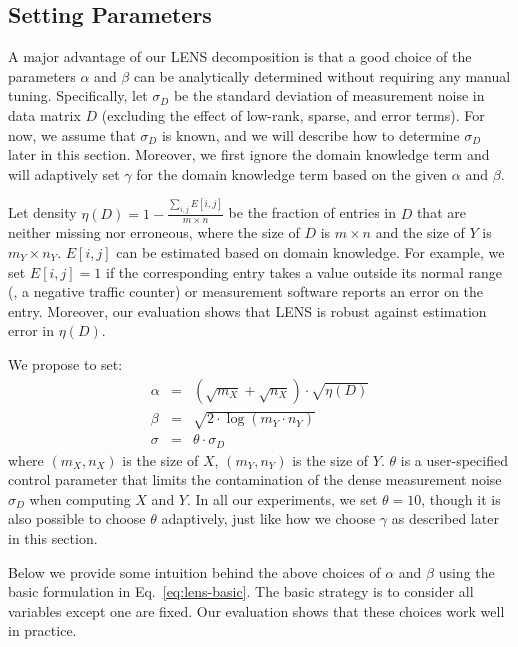\subsection{Setting Parameters}
\label{ssec:para}

 A major advantage of
our LENS decomposition is that a good choice of the parameters
$\alpha$ and $\beta$ can be analytically determined without requiring
any manual tuning.  Specifically, let $\sigma_D$ be the standard
deviation of measurement noise in data matrix $D$ (excluding the
effect of low-rank, sparse, and error terms).  For now, we assume that
$\sigma_D$ is known, and we will describe how to determine $\sigma_D$
later in this section. Moreover, we first ignore the domain knowledge
term and will adaptively set $\gamma$ for the domain knowledge term
based on the given $\alpha$ and $\beta$.

Let density $\eta(D) = 1 - \frac{\sum_{i,j} E[i,j]}{m\times n}$ be the
fraction of entries in $D$ that are neither missing nor erroneous,
where the size of $D$ is $m \times n$ and the size of $Y$ is
$m_Y\times n_Y$. $E[i,j]$ can be estimated based on domain knowledge.
For example, we set $E[i,j]=1$ if the corresponding entry takes a value outside
its normal range (\eg, a negative traffic counter) or measurement
software reports an error on the entry. Moreover, our evaluation shows
that LENS is robust against estimation error in $\eta(D)$.

We propose to set:
\begin{eqnarray}
\alpha &=& (\sqrt{m_X}+\sqrt{n_X})\cdot \sqrt{\eta(D)} \label{eq:alpha}\\
\beta  &=& \sqrt{ 2\cdot \log(m_Y\cdot
  n_Y)} \label{eq:beta}\\
\sigma &=& \theta \cdot \sigma_D \label{eq:sigma}
\end{eqnarray}
where $(m_X,n_X)$ is the size of $X$, $(m_Y,n_Y)$ is the size of $Y$.
$\theta$ is a user-specified control parameter that limits the
contamination of the dense measurement noise $\sigma_D$ when computing
$X$ and $Y$.  In all our experiments, we set $\theta = 10$,
though it is also possible to choose $\theta$ adaptively, just like
how we choose $\gamma$ as described later in this section.

Below we provide some intuition behind the above choices of $\alpha$
and $\beta$ using the basic formulation in
Eq.~\eqref{eq:lens-basic}. The basic strategy is to consider all
variables except one are fixed.
Our evaluation shows that these choices work well in
practice.  

